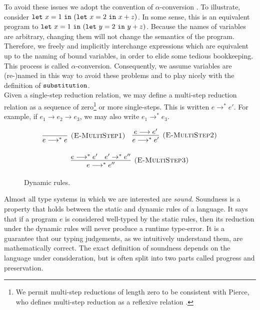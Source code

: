 To avoid these issues we adopt the convention of $\alpha$-conversion \cite[p. 71]{tapl}. To illustrate, consider $\mathtt{let}~ x = 1~\mathtt{in}~ (\mathtt{let}~ x = 2~\mathtt{in}~ x+z)$. In some sense, this is an equivalent program to $\mathtt{let}~ x = 1~\mathtt{in}~ (\mathtt{let}~ y = 2~\mathtt{in}~ y+z)$. Because the names of variables are arbitrary, changing them will not change the semantics of the program. Therefore, we freely and implicitly interchange expressions which are equivalent up to the naming of bound variables, in order to elide some tedious bookkeeping. This process is called $\alpha$-conversion. Consequently, we assume variables are (re-)named in this way to avoid these problems and to play nicely with the definition of $\mathtt{substitution}$. \\

Given a single-step reduction relation, we may define a multi-step reduction relation as a sequence of zero\footnote{We permit multi-step reductions of length zero to be consistent with Pierce, who defines multi-step reduction as a reflexive relation \cite[p. 39]{tapl}.} or more single-steps. This is written $e \longrightarrow^* e'$. For example, if $e_1 \longrightarrow e_2 \longrightarrow e_3$, we may also write $e_1 \longrightarrow^* e_3$. 

\begin{figure}[h]

\noindent
{}

\[
\begin{array}{c}

\infer[\textsc{(E-MultiStep1)}]
	{ e \longrightarrow^{*}  e}
	{}
~~~
\infer[\textsc{(E-MultiStep2)}]
	{ e \longrightarrow^{*}  e'}
	{ e \longrightarrow  e'} \\[3ex]
	
\infer[\textsc{(E-MultiStep3)}]
	{e \longrightarrow^{*}  e''}
	{ e \longrightarrow^{*}  e' &  e' \rightarrow^{*}  e''}
\end{array}
\]
\vspace{-12pt}
\caption{Dynamic rules.}
\label{This is the label.}
\end{figure}

Almost all type systems in which we are interested are \textit{sound}. Soundness is a property that holds between the static and dynamic rules of a language. It says that if a program $e$ is considered well-typed by the static rules, then its reduction under the dynamic rules will never produce a runtime type-error. It is a guarantee that our typing judgements, as we intuitively understand them, are mathematically correct. The exact definition of soundness depends on the language under consideration, but is often split into two parts called progress and preservation.

